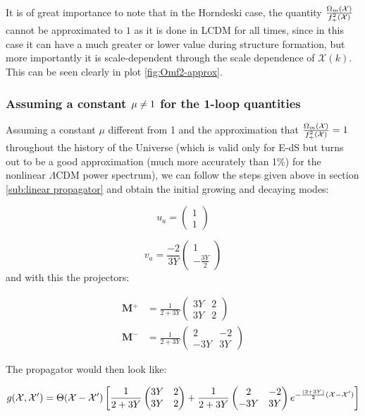 It is of great importance to note that in the Horndeski case, the
quantity $\frac{\Omega_{m}(\mathcal{X})}{f_{+}^{2}(\mathcal{X})}$ cannot be
approximated to $1$ as it is done in LCDM for all times, since in
this case it can have a much greater or lower value during structure
formation, but more importantly it is scale-dependent through the
scale dependence of $\mathcal{X}(k)$. This can be seen clearly in
plot \ref{fig:Omf2-approx}.


\subsubsection*{Assuming a constant $\mu\protect\neq1$ for the 1-loop quantities}

Assuming a constant $\mu$ different from 1 and the approximation
that $\frac{\Omega_{m}(\mathcal{X})}{f_{+}^{2}(\mathcal{X})}=1$ throughout
the history of the Universe (which is valid only for E-dS but turns
out to be a good approximation (much more accurately than 1\%) for
the nonlinear $\Lambda\textrm{CDM}$ power spectrum), we can follow
the steps given above in section \ref{sub:linear propagator} and
obtain the initial growing and decaying modes:

\[
u_{a}=\begin{pmatrix}1\\
1
\end{pmatrix}
\]


\[
v_{a}=\frac{-2}{3Y}\begin{pmatrix}1\\
-\frac{3Y}{2}
\end{pmatrix}
\]
and with this the projectors:

\begin{align*}
\mathrm{\mathbf{M}}{}^{+} & =\frac{1}{2+3Y}\begin{pmatrix}3Y & 2\\
3Y & 2
\end{pmatrix}\\
\mathbf{\mathrm{\mathbf{M}}}^{-} & =\frac{1}{2+3Y}\begin{pmatrix}2 & -2\\
-3Y & 3Y
\end{pmatrix}
\end{align*}


The propagator would then look like:

\begin{equation}
g(\mathcal{X},\mathcal{X}')=\Theta(\mathcal{X}-\mathcal{X}')\left[\frac{1}{2+3Y}\begin{pmatrix}3Y & 2\\
3Y & 2
\end{pmatrix}+\frac{1}{2+3Y}\begin{pmatrix}2 & -2\\
-3Y & 3Y
\end{pmatrix}e^{-\frac{(2+3Y)}{2}(\mathcal{X}-\mathcal{X}')}\right]\label{eq:ghorn}
\end{equation}


